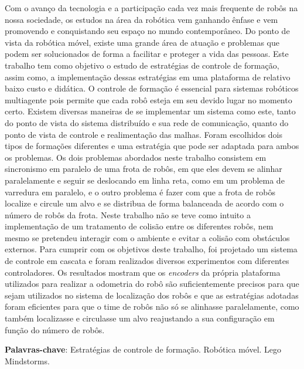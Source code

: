 %
%

\begin{resumo}

Com o avanço da tecnologia e a participação cada vez mais frequente de robôs na nossa sociedade, os estudos na área da robótica vem ganhando ênfase e vem promovendo e conquistando seu espaço no mundo contemporâneo. %
Do ponto de vista da robótica móvel, existe uma grande área de atuação e problemas que podem ser solucionados de forma a facilitar e proteger a vida das pessoas. Este trabalho tem como objetivo o estudo de estratégias de controle de formação, assim como, a implementação dessas estratégias em uma plataforma de relativo baixo custo e didática. O controle de formação é essencial para sistemas robóticos multiagente pois permite que cada robô esteja em seu devido lugar no momento certo. Existem diversas maneiras de se implementar um sistema como este, tanto do ponto de vista do sistema distribuído e sua rede de comunicação, quanto do ponto de vista de controle e realimentação das malhas. Foram escolhidos dois tipos de formações diferentes e uma estratégia que pode ser adaptada para ambos os problemas. Os dois problemas abordados neste trabalho consistem em sincronismo em paralelo de uma frota de robôs, em que eles devem se alinhar paralelamente e seguir se deslocando em linha reta, como em um problema de varredura em paralelo, e o outro problema é fazer com que a frota de robôs localize e circule um alvo e se distribua de forma balanceada de acordo com o número de robôs da frota. Neste trabalho não se teve como intuito a implementação de um tratamento de colisão entre os diferentes robôs, nem mesmo se pretendeu interagir com o ambiente e evitar a  colisão com obstáculos externos. Para cumprir com os objetivos deste trabalho, foi projetado um sistema de controle em cascata e foram realizados diversos experimentos com diferentes controladores. Os resultados mostram que os \emph{encoders} da própria plataforma utilizados para realizar a odometria do robô são suficientemente precisos para que sejam utilizados no sistema de localização dos robôs e que as estratégias adotadas foram eficientes para que o time de robôs não só se alinhasse paralelamente, como também localizasse e circulasse um alvo reajustando a sua configuração em função do número de robôs.

\textbf{Palavras-chave}: Estratégias de controle de formação. Robótica móvel. Lego Mindstorms. 
\end{resumo}
